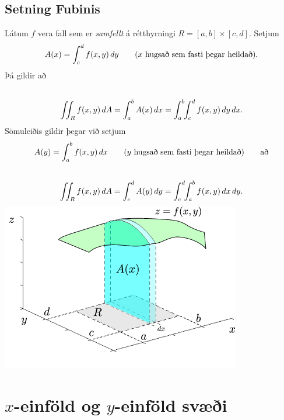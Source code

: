 \documentclass[a4paper,10pt,icelandic]{sphinxmanual}
\begin{document}
\subsection{Setning Fubinis}
\label{Kafli4:setning-fubinis}\label{Kafli4:index-3}
Látum \(f\) vera fall sem er \textit{samfellt} á rétthyrningi
\(R=[a,b]\times
[c,d]\). Setjum
\begin{gather}
\begin{split}\displaystyle A(x)=\int_c^d f(x,y)\,dy\qquad\mbox{($x$ hugsað sem fasti þegar heildað)}.\end{split}\notag
\end{gather}
Þá gildir að
\begin{gather}
\begin{split}\displaystyle\end{split}\notag\\\begin{split}\int\!\!\!\int_R f(x,y)\,dA=\int_a^b A(x)\,dx=\int_a^b\!\!\int_c^d
f(x,y)\,dy\,dx.\end{split}\notag
\end{gather}
Sömuleiðis gildir þegar við setjum
\begin{gather}
\begin{split}\displaystyle A(y)=\int_a^b f(x,y)\,dx\qquad\mbox{($y$ hugsað sem fasti þegar heildað)} \qquad \text{að}\end{split}\notag
\end{gather}\begin{gather}
\begin{split}\displaystyle\end{split}\notag\\\begin{split}\int\!\!\!\int_R f(x,y)\,dA=\int_c^d A(y)\,dy=\int_c^d\!\!\int_a^b
f(x,y)\,dx\,dy.\end{split}\notag
\end{gather}
{\hfill\includegraphics[width=0.500\linewidth]{ax1.png}\hfill}


\section{\(x\)-einföld og \(y\)-einföld svæði}
\label{Kafli4:einfold-og-einfold-svaei}
\end{document}
